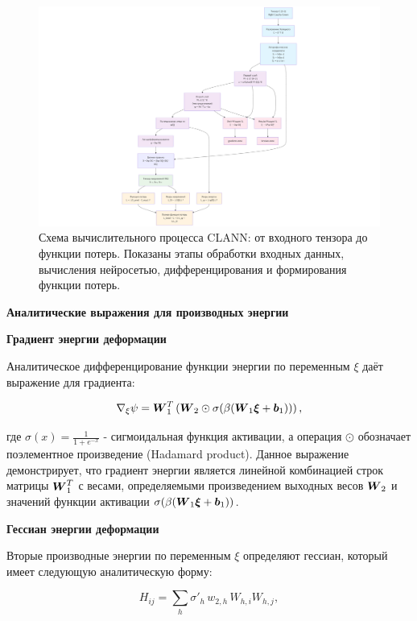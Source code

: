 \begin{figure}[htbp]
\centering
\includegraphics[width=1.3\textwidth]{img/clann_arc.png}
\caption{Схема вычислительного процесса CLANN: от входного тензора до функции потерь. Показаны этапы обработки входных данных, вычисления нейросетью, дифференцирования и формирования функции потерь.}
\label{fig:clann_architecture}
\end{figure}

\textbf{Аналитические выражения для производных энергии}

\textbf{Градиент энергии деформации}

Аналитическое дифференцирование функции энергии по переменным \(\xi\) даёт выражение для градиента:

\begin{equation}
 \nabla_\xi \psi = \boldsymbol{W}_1^T \left( \boldsymbol{W}_2 \odot \sigma(\beta (\boldsymbol{W}_1 \boldsymbol{\xi} + \boldsymbol{b}_1)) \right),
\label{eq:energy_gradient}
\end{equation}

где $\sigma(x) = \frac{1}{1 + e^{-x}}$ - сигмоидальная функция активации, 
а операция $\odot$ обозначает поэлементное произведение (Hadamard product). 
Данное выражение демонстрирует, что градиент энергии является линейной комбинацией строк матрицы $\boldsymbol{W}_1^T$ с весами, 
определяемыми произведением выходных весов $\boldsymbol{W}_2$ и значений функции активации $\sigma(\beta (\boldsymbol{W}_1 \boldsymbol{\xi} + \boldsymbol{b}_1))$.

\textbf{Гессиан энергии деформации}

Вторые производные энергии по переменным \(\xi\) определяют гессиан, который имеет следующую аналитическую форму:

\begin{equation}
 H_{ij} = \sum_h \sigma'_h\,w_{2,h}\,W_{h,i}W_{h,j},
\label{eq:energy_hessian}
\end{equation}

